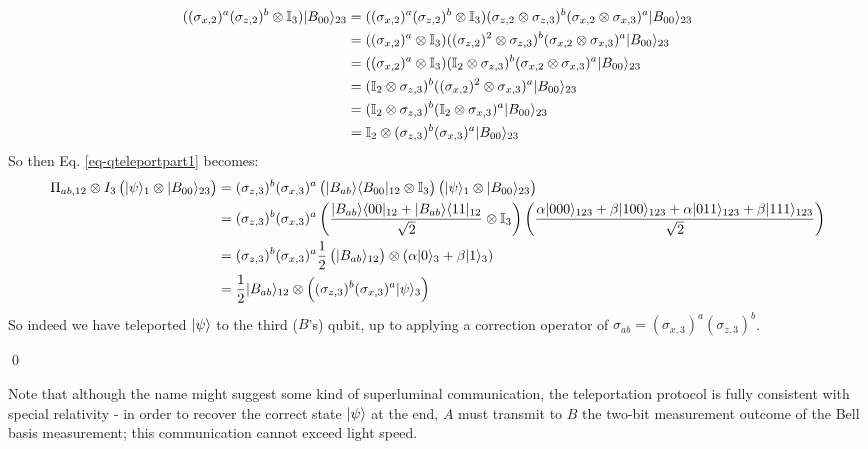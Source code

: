\begin{equation}
    \begin{split}
        ((\sigma_{x, 2})^a(\sigma_{z, 2})^b \otimes \mathbb{I}_3)\lvert B_{00} \rangle_{23} &= ((\sigma_{x, 2})^a(\sigma_{z, 2})^b \otimes \mathbb{I}_3)(\sigma_{z, 2} \otimes \sigma_{z, 3})^b(\sigma_{x, 2} \otimes \sigma_{x, 3})^a\lvert B_{00} \rangle_{23}
        \\ &= ((\sigma_{x, 2})^a\otimes \mathbb{I}_3)((\sigma_{z, 2})^2 \otimes \sigma_{z, 3})^b(\sigma_{x, 2} \otimes \sigma_{x, 3})^a\lvert B_{00} \rangle_{23}
        \\ &= ((\sigma_{x, 2})^a\otimes \mathbb{I}_3)(\mathbb{I}_2 \otimes \sigma_{z, 3})^b(\sigma_{x, 2} \otimes \sigma_{x, 3})^a\lvert B_{00} \rangle_{23}
        \\ &= (\mathbb{I}_2 \otimes \sigma_{z, 3})^b((\sigma_{x, 2})^2\otimes \sigma_{x, 3})^a\lvert B_{00} \rangle_{23}
        \\ &= (\mathbb{I}_2 \otimes \sigma_{z, 3})^b(\mathbb{I}_2 \otimes \sigma_{x, 3})^a\lvert B_{00} \rangle_{23}
        \\ &= \mathbb{I}_2 \otimes (\sigma_{z, 3})^b(\sigma_{x, 3})^a \lvert B_{00} \rangle_{23}
    \end{split}
\end{equation}
So then Eq. \eqref{eq-qteleportpart1} becomes:
\begin{equation}
    \begin{split}
        \Pi_{ab, 12} \otimes I_3\left(\lvert \psi \rangle_1 \otimes \lvert B_{00} \rangle_{23}\right) &= (\sigma_{z, 3})^b(\sigma_{x, 3})^a\left( \lvert B_{ab} \rangle \langle B_{00} \rvert_{12} \otimes \mathbb{I}_3\right) \left(\lvert \psi \rangle_1 \otimes \lvert B_{00} \rangle_{23}\right)
        \\ &= (\sigma_{z, 3})^b(\sigma_{x, 3})^a\left( \frac{\lvert B_{ab} \rangle \langle 00 \rvert_{12} + \lvert B_{ab} \rangle \langle 11 \rvert_{12}}{\sqrt{2}} \otimes \mathbb{I}_3\right) \left(\frac{\alpha\lvert 000 \rangle_{123} + \beta\lvert 100 \rangle_{123} + \alpha\lvert 011 \rangle_{123} + \beta\lvert 111 \rangle_{123}}{\sqrt{2}}\right)
        \\ &= (\sigma_{z, 3})^b(\sigma_{x, 3})^a\frac{1}{2}\left(\lvert B_{ab} \rangle_{12}\right) \otimes (\alpha\lvert 0 \rangle_3 + \beta\lvert 1 \rangle_3)
        \\ &= \frac{1}{2}\lvert B_{ab} \rangle_{12} \otimes \left((\sigma_{z, 3})^b(\sigma_{x, 3})^a\lvert \psi \rangle_3\right)
    \end{split}
\end{equation}
So indeed we have teleported $\lvert \psi \rangle$ to the third ($B$'s) qubit, up to applying a correction operator of $\sigma_{ab} = (\sigma_{x, 3})^a(\sigma_{z, 3})^b$. 

\qed

Note that although the name might suggest some kind of superluminal communication, the teleportation protocol is fully consistent with special relativity - in order to recover the correct state $\lvert \psi \rangle$ at the end, $A$ must transmit to $B$ the two-bit measurement outcome of the Bell basis measurement; this communication cannot exceed light speed.

